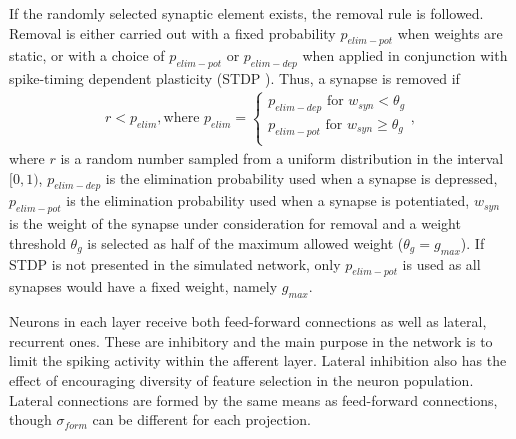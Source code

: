 \documentclass{article}
\begin{document}
If the randomly selected synaptic element exists, the removal rule is followed.
Removal is either carried out with a fixed probability $p_{elim-pot}$ when weights are static, or with a choice of $p_{elim-pot}$  or $p_{elim-dep}$ when applied in conjunction with spike-timing dependent plasticity (STDP \cite{Song2000}). 
Thus, a synapse is removed if
%
\begin{equation} \label{eq:elimination_rule}
\begin{aligned}
r<p_{elim}, \text{where }  p_{elim} = 
    \begin{cases}
        p_{elim-dep} \text{ for }   w_{syn}  < \theta_g \\
        p_{elim-pot} \text{ for }   w_{syn}  \geq \theta_g \\
    \end{cases},
\end{aligned}
\end{equation}
%
where $r$ is a random number sampled from a uniform distribution in the interval $[0, 1)$, $p_{elim-dep}$ is the elimination probability used when a synapse is depressed, $p_{elim-pot}$ is the elimination probability used when a synapse is potentiated, $w_{syn}$ is the weight of the synapse under consideration for removal and a weight threshold $\theta_g$ is selected as half of the maximum allowed weight ($ \theta_g = g_{max}$). 
If STDP is not presented in the simulated network, only $p_{elim-pot}$ is used as all synapses would have a fixed weight, namely $g_{max}$.

Neurons in each layer receive both feed-forward connections as well as lateral, recurrent ones.
These are inhibitory and the main purpose in the network is to limit the spiking activity within the afferent layer. 
Lateral inhibition also has the effect of encouraging diversity of feature selection in the neuron population.
Lateral connections are formed by the same means as feed-forward connections, though $\sigma_{form}$ can be different for each projection.
\end{document}
